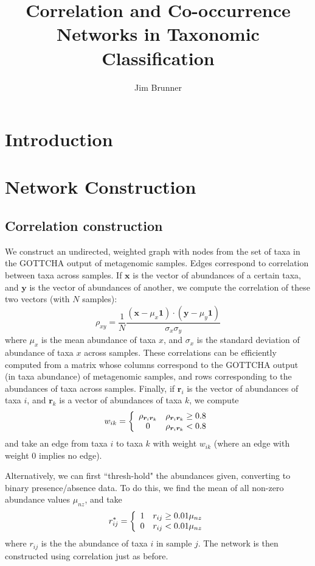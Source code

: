 \documentclass[10pt]{article}
\author{Jim Brunner}
\title{Correlation and Co-occurrence Networks in Taxonomic Classification}
\theoremstyle{definition}
\numberwithin{theorem}{section}
\numberwithin{definition}{section}
\numberwithin{lemma}{section}
\numberwithin{corollary}{section}
\numberwithin{clm}{section}
\numberwithin{rmk}{section}
\renewcommand{\b}{\bm}
\begin{document}
\maketitle

\section{Introduction}
\cite{edge}\cite{gottcha}\cite{ecol_net_rev}\cite{mic_int}\cite{machine_learning}\cite{PhysRevE.70.056131}\cite{PhysRevE.70.066111}\cite{cyotscape}\cite{gut}
\section{Network Construction}

\subsection{Correlation construction}
We construct an undirected, weighted graph with nodes from the set of taxa in the GOTTCHA output of metagenomic samples. Edges correspond to correlation between taxa across samples. If $\b{x}$ is the vector of abundances of a certain taxa, and $\b{y}$ is the vector of abundances of another, we compute the correlation of these two vectors (with $N$ samples):
\[
\rho_{xy} = \frac{1}{N}\frac{(\b{x}- \mu_x\b{1}) \cdot (\b{y} - \mu_y\b{1})}{\sigma_x \sigma_y}
\]
where $\mu_x$ is the mean abundance of taxa $x$, and $\sigma_x$ is the standard deviation of abundance of taxa $x$ across samples. These correlations can be efficiently computed from a matrix whose columns correspond to the GOTTCHA output (in taxa abundance) of metagenomic samples, and rows corresponding to the abundances of taxa across samples. Finally, if $\b{r}_i$ is the vector of abundances of taxa $i$, and $\b{r}_k$ is a vector of abundances of taxa $k$, we compute
\[
w_{ik} = \left\{\begin{array}{c c}
\rho_{\b{r}_i\b{r}_k} & \rho_{\b{r}_i\b{r}_k}\geq 0.8\\
0 &  \rho_{\b{r}_i\b{r}_k}< 0.8
\end{array}\right.
\]
and take an edge from taxa $i$ to taxa $k$ with weight $w_{ik}$ (where an edge with weight $0$ implies no edge).

Alternatively, we can first ``thresh-hold" the abundances given, converting to binary presence/absence data. To do this, we find the mean of all non-zero abundance values $\mu_{nz}$, and take
\[
r^*_{ij} = \left\{\begin{array}{c c}
1 & r_{ij} \geq 0.01\mu_{nz}\\
0 & r_{ij} < 0.01 \mu_{nz}
\end{array}\right.
\]
where $r_{ij}$ is the the abundance of taxa $i$ in sample $j$. The network is then constructed using correlation just as before.
\end{document}

